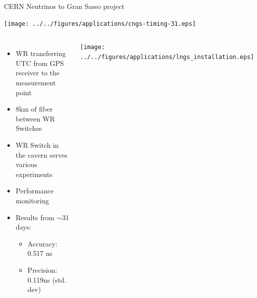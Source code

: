 \documentclass[compress,red]{beamer}
\begin{document}
\begin{frame}{CERN Neutrinos to Gran Sasso project}
   {
    \begin{center}
      \texttt{[image: ../../figures/applications/cngs-timing-31.eps]}
    \end{center}
  }
 
   {
  \begin{columns}[c]
    \begin{itemize}
      \item WR transferring UTC from GPS receiver to the measurement point
      \item 8km of fiber between WR Switches
      \item WR Switch in the cavern serves various experiments
      \item Performance monitoring
      \item Results from $\sim$31 days:
        \begin{itemize}
          \item Accuracy: 0.517 ns
          \item Precision: 0.119ns (std. dev)
        \end{itemize}
    \end{itemize}
    \begin{center}
      \texttt{[image: ../../figures/applications/lngs\_installation.eps]}
    \end{center}
  \end{columns}
  }

\end{frame}
\end{document}
